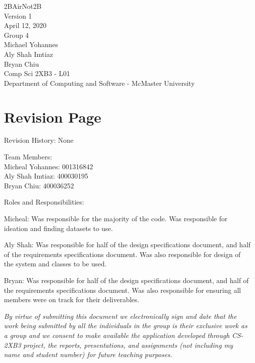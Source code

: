 \let\mypdfximage\pdfximage\def\pdfximage{\immediate\mypdfximage}\documentclass[oneside]{book}
\newcommand{\+}{\discretionary{\mbox{\scriptsize$\hookleftarrow$}}{}{}}
\begin{document}
\hypersetup{pageanchor=false,
             bookmarksnumbered=true,
             pdfencoding=unicode
            }
\begin{titlepage}
\vspace*{7cm}
\begin{center}%
{\Large 2B\+Air\+Not2B }\\
\vspace*{1em}
Version 1\\
April 12, 2020\\
\vspace*{1em}
Group 4\\
Michael Yohannes\\
Aly Shah Imtiaz\\
Bryan Chiu\\
\vspace*{1em}
Comp Sci 2XB3 - L01\\
Department of Computing and Software - McMaster University
\end{center}
\end{titlepage}
\tableofcontents

\chapter{Revision Page}
Revision History: None

Team Members:\\
Micheal Yohannes: 001316842\\
Aly Shah Imtiaz: 400030195\\
Bryan Chiu: 400036252

Roles and Responsibilities: 

Micheal: Was responsible for the majority of the code. Was responsible for ideation and finding datasets to use.

Aly Shah: Was responsible for half of the design specifications document, and half of the requirements specifications document. Was also responsible for design of the system and classes to be used.

Bryan: Was responsible for half of the design specifications document, and half of the requirements specifications document. Was also responsible for ensuring all members were on track for their deliverables.

\textit{By virtue of submitting this document we electronically sign and date that the work being submitted by all the individuals in the group is their exclusive work as a group and we consent to make available the application developed through CS-2XB3 project, the reports, presentations, and assignments (not including my name and student number) for future teaching purposes.}
\end{document}
